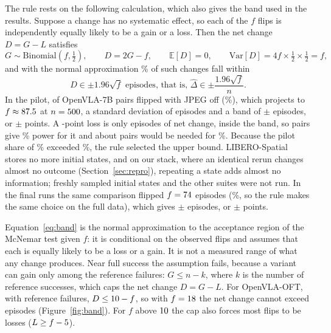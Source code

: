 The rule rests on the following calculation, which also gives the band used in the results. Suppose a change has no systematic effect, so each of the $f$ flips is independently equally likely to be a gain or a loss. Then the net change $D = G - L$ satisfies
\begin{equation}
G \sim \mathrm{Binomial}\!\left(f, \tfrac{1}{2}\right), \qquad D = 2G - f, \qquad \mathbb{E}[D] = 0, \qquad \mathrm{Var}[D] = 4 f \times \tfrac{1}{2} \times \tfrac{1}{2} = f,
\end{equation}
and with the normal approximation \AlphaPct\% of such changes fall within
\begin{equation}
D \in \pm 1.96\sqrt{f} \text{ episodes, that is, } \hat{\Delta} \in \pm \frac{1.96\sqrt{f}}{n}.
\label{eq:band}
\end{equation}
In the pilot, \PilotFlips{} of \PilotPairs{} OpenVLA-7B pairs flipped with JPEG off (\PilotDisc\%), which projects to $f \approx 87.5$ at $n = 500$, a standard deviation of \PilotSD{} episodes and a band of $\pm$\PilotBandEp{} episodes, or $\pm$\PilotBandPts{} points. A \ThresholdPts-point loss is only \ThresholdEp{} episodes of net change, inside the band, so \NPairs{} pairs give \PowerPilot\% power for it and about \PairsForEighty{} pairs would be needed for \PowerTarget\%. Because the pilot share of \PilotDisc\% exceeded \DiscThreshold\%, the rule selected the upper bound. LIBERO-Spatial stores no more initial states, and on our stack, where an identical rerun changes almost no outcome (Section~\ref{sec:repro}), repeating a state adds almost no information; freshly sampled initial states and the other suites were not run. In the final runs the same comparison flipped $f = 74$ episodes (\FinalDisc\%, so the rule makes the same choice on the full data), which gives $\pm$\FinalBandEp{} episodes, or $\pm$\SevJpegBand{} points.

Equation~\eqref{eq:band} is the normal approximation to the acceptance region of the McNemar test given $f$: it is conditional on the observed flips and assumes that each is equally likely to be a loss or a gain. It is not a measured range of what any change produces. Near full success the assumption fails, because a variant can gain only among the reference failures: $G \le n - k$, where $k$ is the number of reference successes, which caps the net change $D = G - L$. For OpenVLA-OFT, with \OftRefFail{} reference failures, $D \le 10 - f$, so with $f = 18$ the net change cannot exceed \OftCropMaxD{} episodes (Figure~\ref{fig:band}). For $f$ above $10$ the cap also forces most flips to be losses ($L \ge f - 5$).

